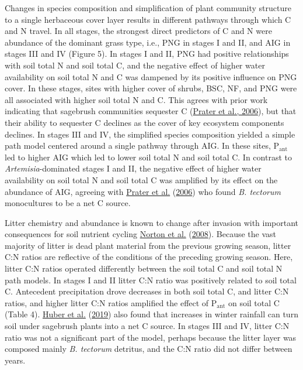 \documentclass[
  11pt,
  a4paper,
]{article}
\begin{document}
Changes in species composition and simplification of plant community structure to a single herbaceous cover layer results in different pathways through which C and N travel. In all stages, the strongest direct predictors of C and N were abundance of the dominant grass type, i.e., PNG in stages I and II, and AIG in stages III and IV (Figure 5). In stages I and II, PNG had positive relationships with soil total N and soil total C, and the negative effect of higher water availability on soil total N and C was dampened by its positive influence on PNG cover. In these stages, sites with higher cover of shrubs, BSC, NF, and PNG were all associated with higher soil total N and C. This agrees with prior work indicating that sagebrush communities sequester C (\protect\hyperlink{ref-Prater2006}{Prater et al., 2006}), but that their ability to sequester C declines as the cover of key ecosystem components declines. In stages III and IV, the simplified species composition yielded a simple path model centered around a single pathway through AIG. In these sites, P\(_\text{ant}\) led to higher AIG which led to lower soil total N and soil total C. In contrast to \emph{Artemisia}-dominated stages I and II, the negative effect of higher water availability on soil total N and soil total C was amplified by its effect on the abundance of AIG, agreeing with \protect\hyperlink{ref-Prater2006}{Prater et al.} (\protect\hyperlink{ref-Prater2006}{2006}) who found \emph{B. tectorum} monocultures to be a net C source.

Litter chemistry and abundance is known to change after invasion with important consequences for soil nutrient cycling \protect\hyperlink{ref-Norton2008}{Norton et al.} (\protect\hyperlink{ref-Norton2008}{2008}). Because the vast majority of litter is dead plant material from the previous growing season, litter C:N ratios are reflective of the conditions of the preceding growing season. Here, litter C:N ratios operated differently between the soil total C and soil total N path models. In stages I and II litter C:N ratio was positively related to soil total C. Antecedent precipitation drove decreases in both soil total C, and litter C:N ratios, and higher litter C:N ratios amplified the effect of P\(_\text{ant}\) on soil total C (Table 4). \protect\hyperlink{ref-Huber2019}{Huber et al.} (\protect\hyperlink{ref-Huber2019}{2019}) also found that increases in winter rainfall can turn soil under sagebrush plants into a net C source. In stages III and IV, litter C:N ratio was not a significant part of the model, perhaps because the litter layer was composed mainly \emph{B. tectorum} detritus, and the C:N ratio did not differ between years.
\end{document}
